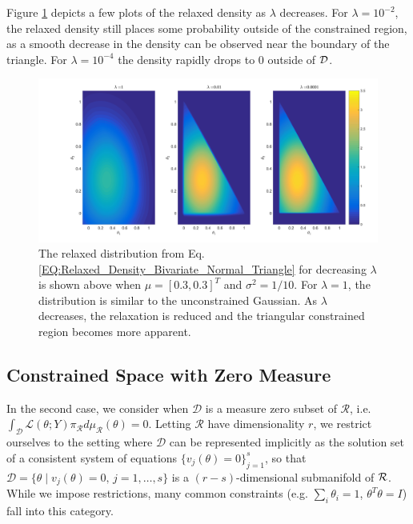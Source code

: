 \documentclass[10pt,fleqn]{article} \pdfoutput=1
\DeclareMathOperator{\1}{\mathbbm{1}} \DeclareMathOperator{\bigO}{\mc O}
\begin{document}
Figure \ref{FIG:Bivariate_Normal_Triangle_Constraint_Relaxation} depicts a few
plots of the relaxed density as $\lambda$ decreases.
For $\lambda= 10^{-2}$, the relaxed density still places some probability outside of the constrained region,
as a smooth decrease in the density can be observed near the
boundary of the triangle. For $\lambda=10^{-4}$
the density rapidly drops to $0$ outside of $\mathcal{D}$.

\begin{figure}[H] \begin{center}
		\includegraphics[width=1\textwidth]{Bivariate_Normal_Triangle_Constraint}
	\end{center} \caption{The relaxed distribution from Eq.
	\eqref{EQ:Relaxed_Density_Bivariate_Normal_Triangle} for decreasing $\lambda$ is
	shown above when $\mu = [0.3, 0.3]^T$ and $\sigma^2 = 1/10.$  For
	$\lambda=1$, the distribution is similar to the unconstrained Gaussian.  As
	$\lambda$ decreases, the relaxation is reduced and the triangular
	constrained region becomes more apparent.}
	\label{FIG:Bivariate_Normal_Triangle_Constraint_Relaxation} \end{figure} 
	

\subsection{Constrained Space with Zero Measure} \label{SEC:Zero_Measure_Methods}

In the second case, we consider when $\mathcal{D}$ is a measure zero subset
of $\mathcal{R}$, i.e.
$\int_\mathcal{D}\mathcal{L}(\theta;Y)\pi_\mathcal{R}d\mu_\mathcal{R}(\theta)=0$.
Letting $\mathcal{R}$ have dimensionality $r$, we restrict ourselves to the
setting where $\mathcal{D}$ can be represented implicitly as the solution
set of a consistent system of equations $\{v_j(\theta) = 0\}_{j=1}^s$, so
that $\mathcal{D} =\{\theta \mid v_j(\theta) =0, \, j = 1, \dots,s\}$ is a
$(r-s)$-dimensional submanifold of $\mathcal{R}$.  While we impose restrictions, many
common constraints (e.g.  $\sum_i \theta_i = 1$, $\theta^T\theta=I$) fall
into this category.
\end{document}
